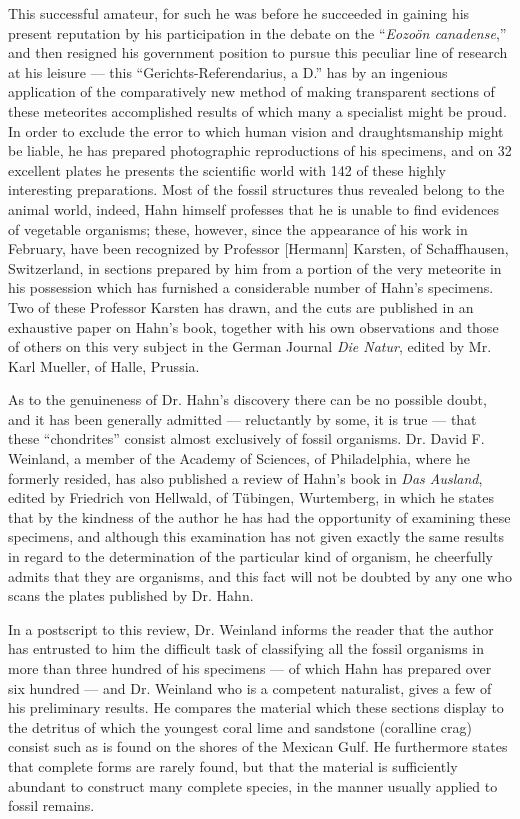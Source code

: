 \documentclass[a4paper, 12pt, oneside]{article}
\begin{document}
This successful amateur, for such he was before he succeeded in gaining his present reputation by his participation in the debate on the ``\emph{Eozoön canadense},'' and then resigned his government position to pursue this peculiar line of research at his leisure --- this ``Gerichts-Referendarius, a D.'' has by an ingenious application of the comparatively new method of making transparent sections of these meteorites accomplished results of which many a specialist might be proud. In order to exclude the error to which human vision and draughtsmanship might be liable, he has prepared photographic reproductions of his specimens, and on 32 excellent plates he presents the scientific world with 142 of these highly interesting preparations. Most of the fossil structures thus revealed belong to the animal world, indeed, Hahn himself professes that he is unable to find evidences of vegetable organisms; these, however, since the appearance of his work in February, have been recognized by Professor [Hermann] Karsten, of Schaffhausen, Switzerland, in sections prepared by him from a portion of the very meteorite in his possession which has furnished a considerable number of Hahn's specimens. Two of these Professor Karsten has drawn, and the cuts are published in an exhaustive paper on Hahn's book, together with his own observations and those of others on this very subject in the German Journal \emph{Die Natur}, edited by Mr. Karl Mueller, of Halle, Prussia.

As to the genuineness of Dr. Hahn's discovery there can be no possible doubt, and it has been generally admitted --- reluctantly by some, it is true --- that these ``chondrites'' consist almost exclusively of fossil organisms. Dr. David F. Weinland, a member of the Academy of Sciences, of Philadelphia, where he formerly resided, has also published a review of Hahn's book in \emph{Das Ausland}, edited by Friedrich von Hellwald, of Tübingen, Wurtemberg, in which he states that by the kindness of the author he has had the opportunity of examining these specimens, and although this examination has not given exactly the same results in regard to the determination of the particular kind of organism, he cheerfully admits that they are organisms, and this fact will not be doubted by any one who scans the plates published by Dr. Hahn.

In a postscript to this review, Dr. Weinland informs the reader that the author has entrusted to him the difficult task of classifying all the fossil organisms in more than three hundred of his specimens --- of which Hahn has prepared over six hundred --- and Dr. Weinland who is a competent naturalist, gives a few of his preliminary results. He compares the material which these sections display to the detritus of which the youngest coral lime and sandstone (coralline crag) consist such as is found on the shores of the Mexican Gulf. He furthermore states that complete forms are rarely found, but that the material is sufficiently abundant to construct many complete species, in the manner usually applied to fossil remains. 
\end{document}
